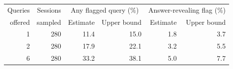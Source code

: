 \begin{tabular}{rrrrrr}
\toprule
Queries & Sessions & \multicolumn{2}{c}{Any flagged query (\%)} & \multicolumn{2}{c}{Answer-revealing flag (\%)} \\
offered & sampled & Estimate & Upper bound & Estimate & Upper bound \\
\midrule
1 & 280 & 11.4 & 15.0 & 1.8 & 3.7 \\
2 & 280 & 17.9 & 22.1 & 3.2 & 5.5 \\
6 & 280 & 33.2 & 38.1 & 5.0 & 7.7 \\
\bottomrule
\end{tabular}
